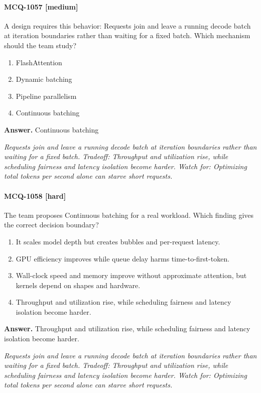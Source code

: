 \paragraph{MCQ-1057 [medium]} A design requires this behavior: Requests join and leave a running decode batch at iteration boundaries rather than waiting for a fixed batch. Which mechanism should the team study?
\begin{enumerate}[label=\Alph*.]
\item FlashAttention
\item Dynamic batching
\item Pipeline parallelism
\item Continuous batching
\end{enumerate}
\noindent\textbf{Answer.} Continuous batching
\par\textit{Requests join and leave a running decode batch at iteration boundaries rather than waiting for a fixed batch. Tradeoff: Throughput and utilization rise, while scheduling fairness and latency isolation become harder. Watch for: Optimizing total tokens per second alone can starve short requests.}
\paragraph{MCQ-1058 [hard]} The team proposes Continuous batching for a real workload. Which finding gives the correct decision boundary?
\begin{enumerate}[label=\Alph*.]
\item It scales model depth but creates bubbles and per-request latency.
\item GPU efficiency improves while queue delay harms time-to-first-token.
\item Wall-clock speed and memory improve without approximate attention, but kernels depend on shapes and hardware.
\item Throughput and utilization rise, while scheduling fairness and latency isolation become harder.
\end{enumerate}
\noindent\textbf{Answer.} Throughput and utilization rise, while scheduling fairness and latency isolation become harder.
\par\textit{Requests join and leave a running decode batch at iteration boundaries rather than waiting for a fixed batch. Tradeoff: Throughput and utilization rise, while scheduling fairness and latency isolation become harder. Watch for: Optimizing total tokens per second alone can starve short requests.}

